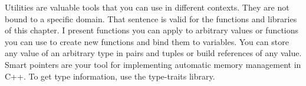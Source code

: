 


Utilities are valuable tools that you can use in different contexts. They are not bound to a specific domain. That sentence is valid for the functions and libraries of this chapter. I present functions you can apply to arbitrary values or functions you can use to create new functions and bind them to variables. You can store any value of an arbitrary type in pairs and tuples or build references of any value. Smart pointers are your tool for implementing automatic memory management in C++. To get type information, use the type-traits library.